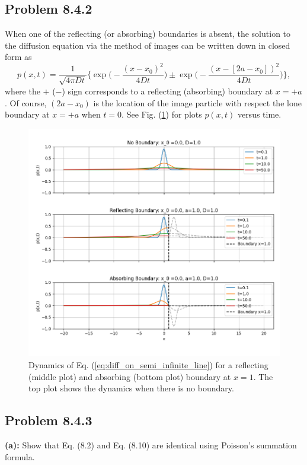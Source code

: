 \subsection{Problem 8.4.2}
When one of the reflecting (or absorbing) boundaries is absent, the solution to the diffusion equation via the method of images can be written down in closed form as
\begin{equation}
p(x,t) = \frac{1}{\sqrt{4 \pi D t} } \bigg\{ \exp \bigg( - \frac{(x-x_0)^2}{4Dt}\bigg) \pm \exp \bigg( - \frac{(x-[2a-x_0])^2}{4Dt}\bigg) \bigg\}, \label{eq:diff_on_semi_infinite_line}
\end{equation}
where the $+$ ($-$) sign corresponds to a reflecting (absorbing) boundary at $x=+a$. Of course, $(2a-x_0)$ is the location of the image particle with respect the lone boundary at $x=+a$ when $t=0$. See Fig. (\ref{fig:8p2}) for plots $p(x,t)$ versus time.

\begin{figure}[hb!]
\centering
\includegraphics[width=14cm]{reflecting_absorbing_dynamics.png}
    \caption{Dynamics of Eq. (\ref{eq:diff_on_semi_infinite_line}) for a reflecting (middle plot) and absorbing (bottom plot) boundary at $x=1$. The top plot shows the dynamics when there is no boundary.}
    \label{fig:8p2}
\end{figure}

\subsection{Problem 8.4.3}
\textbf{(a):} Show that Eq. (8.2) and Eq. (8.10) are identical using Poisson's summation formula.

